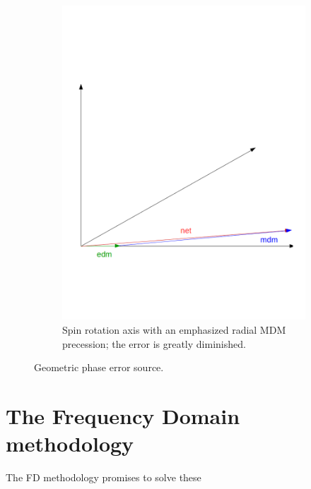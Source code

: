 \documentclass{article}
\begin{document}
\begin{figure}
\begin{subfigure}[b]{.5\textwidth}
    \includegraphics[width=\textwidth]{img/geometric_phase_2}
    \caption{Spin rotation axis with an emphasized radial MDM precession; the error is greatly diminished.}
  \end{subfigure}
\caption{Geometric phase error source.\label{fig:GeomPhase}}
\end{figure}

\section{The Frequency Domain methodology}
The FD methodology promises to solve these 
\end{document}
